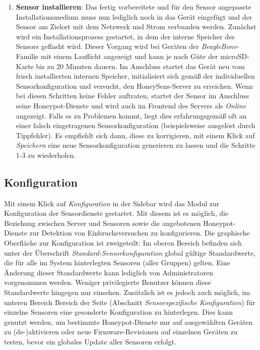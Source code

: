 \documentclass[12pt]{article}
\begin{document}
\begin{enumerate}
				\item \textbf{Sensor installieren}: Das fertig vorbereitete und für den Sensor angepasste Installationsmedium muss nun lediglich noch in das Gerät eingefügt und der Sensor am Zielort mit dem Netzwerk und Strom verbunden werden. Zunächst wird ein Installationsprozess gestartet, in dem der interne Speicher des Sensors geflasht wird. Dieser Vorgang wird bei Geräten der \textit{BeagleBone}-Familie mit einem Lauflicht angezeigt und kann je nach Güte der microSD-Karte bis zu 20 Minuten dauern. Im Anschluss startet das Gerät neu vom frisch installierten internen Speicher, initialisiert sich gemäß der individuellen Sensorkonfiguration und versucht, den HoneySens-Server zu erreichen. Wenn bei diesen Schritten keine Fehler auftraten, startet der Sensor im Anschluss seine Honeypot-Dienste und wird auch im Frontend des Servers als \textit{Online} angezeigt. Falls es zu Problemen kommt, liegt dies erfahrungsgemäß oft an einer falsch eingetragenen Sensorkonfiguration (beispielsweise ausgelöst durch Tippfehler). Es empfiehlt sich dann, diese zu korrigieren, mit einem Klick auf \textit{Speichern} eine neue Sensorkonfiguration generieren zu lassen und die Schritte 1-3 zu wiederholen.
\end{enumerate}

\subsection{Konfiguration} \label{sensor-configuration}
Mit einem Klick auf \textit{Konfiguration} in der Sidebar wird das Modul zur Konfiguration der Sensordienste gestartet. Mit diesem ist es möglich, die Beziehung zwischen Server und Sensoren sowie die angebotenen Honeypot-Dienste zur Detektion von Einbruchsversuchen zu konfigurieren. Die graphische Oberfläche zur Konfiguration ist zweigeteilt: Im oberen Bereich befinden sich unter der Überschrift \textit{Standard-Sensorkonfiguration} global gültige Standardwerte, die für alle im System hinterlegten Sensoren (aller Gruppen) gelten. Eine Änderung dieser Standardwerte kann lediglich von Administratoren vorgenommen werden. Weniger privilegierte Benutzer können diese Standardwerte hingegen nur einsehen. Zusätzlich ist es jedoch auch möglich, im unteren Bereich Bereich der Seite (Abschnitt \textit{Sensorspezifische Konfiguration}) für einzelne Sensoren eine gesonderte Konfiguration zu hinterlegen. Dies kann genutzt werden, um bestimmte Honeypot-Dienste nur auf ausgewählten Geräten zu (de-)aktivieren oder neue Firmware-Revisionen auf einzelnen Geräten zu testen, bevor ein globales Update aller Sensoren erfolgt.
\end{document}
